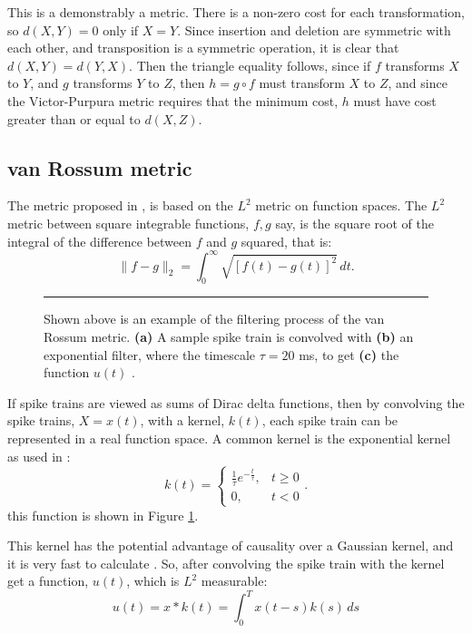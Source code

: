 This is a demonstrably a metric. There is a non-zero cost for each transformation, so $d(X,Y)=0$ only if $X=Y$. Since insertion and deletion are symmetric with each other, and transposition is a symmetric operation, it is clear that $d(X,Y)=d(Y,X)$.  Then the triangle equality follows, since if $f$ transforms $X$ to $Y$, and $g$ transforms $Y$ to $Z$, then $h=g\circ f$ must transform $X$ to $Z$, and since the Victor-Purpura metric requires that the minimum cost, $h$ must have cost greater than or equal to $d(X,Z)$.

\subsection{van Rossum metric}

The metric proposed in 
\citep{VanRossum2001a}, is based on the $L^2$ metric on function 
spaces.  The $L^2$ metric between square integrable functions, $f,g$ say, is the square root of the integral of the difference between $f$ and $g$ squared, that is:
\begin{equation}
\| f - g \|_2 = \int_0^{\infty} \sqrt{\left[ f(t)-g(t) \right]^2 }\, dt.
\end{equation}

\begin{figure}[htb]

\bigskip
\rule{35em}{0.5pt}
\caption{\label{stk} Shown above is an example of the filtering process of the van Rossum metric.  {\bf (a)} A sample spike train is convolved with {\bf (b)} an exponential filter, where the timescale $\tau=20$ ms, to get {\bf (c)} the function $u(t)$ .}
\end{figure}

If spike trains are viewed as sums of Dirac delta functions, 
then by convolving the spike trains, $X=x(t)$, with 
a kernel, $k(t)$, each spike train can be represented in a real function space.  A common kernel is the exponential kernel as used in \citep{VanRossum2001a}:
\begin{equation}
k(t) = \left\{ \begin{array}{ll}\frac{1}{\tau}e^{-\frac{t}{\tau}}, & t\geq 0 \\
0, & t<0\end{array} \right. .
\end{equation}
this function is shown in Figure \ref{stk}.

This kernel has the potential advantage of causality over a 
Gaussian kernel, and it is very fast to calculate \citep{HoughtonKreuz2012a}.   So, after convolving the spike 
train with the kernel get a function, $u(t)$, which is $L^2$ measurable:
\begin{equation}
u(t) = x*k(t) = \int_0^T x(t-s)k(s)\,ds
\end{equation}



